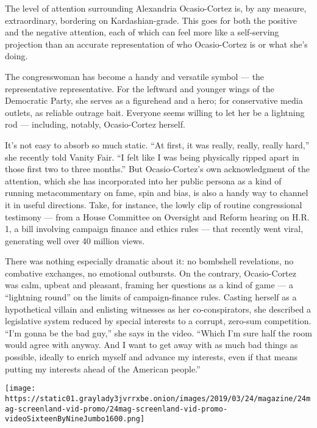 The level of attention surrounding Alexandria Ocasio-Cortez is, by any
measure, extraordinary, bordering on Kardashian-grade. This goes for
both the positive and the negative attention, each of which can feel
more like a self-serving projection than an accurate representation of
who Ocasio-Cortez is or what she's doing.

The congresswoman has become a handy and versatile symbol --- the
representative representative. For the leftward and younger wings of the
Democratic Party, she serves as a figurehead and a hero; for
conservative media outlets, as reliable outrage bait. Everyone seems
willing to let her be a lightning rod --- including, notably,
Ocasio-Cortez herself.

It's not easy to absorb so much static. ``At first, it was really,
really, really hard,'' she recently told Vanity Fair. ``I felt like I
was being physically ripped apart in those first two to three months.''
But Ocasio-Cortez's own acknowledgment of the attention, which she has
incorporated into her public persona as a kind of running metacommentary
on fame, spin and bias, is also a handy way to channel it in useful
directions. Take, for instance, the lowly clip of routine congressional
testimony --- from a House Committee on Oversight and Reform hearing on
H.R. 1, a bill involving campaign finance and ethics rules --- that
recently went viral, generating well over 40 million views.

There was nothing especially dramatic about it: no bombshell
revelations, no combative exchanges, no emotional outbursts. On the
contrary, Ocasio-Cortez was calm, upbeat and pleasant, framing her
questions as a kind of game --- a ``lightning round'' on the limits of
campaign-finance rules. Casting herself as a hypothetical villain and
enlisting witnesses as her co-conspirators, she described a legislative
system reduced by special interests to a corrupt, zero-sum competition.
``I'm gonna be the bad guy,'' she says in the video. ``Which I'm sure
half the room would agree with anyway. And I want to get away with as
much bad things as possible, ideally to enrich myself and advance my
interests, even if that means putting my interests ahead of the American
people.''

\texttt{[image: https://static01.graylady3jvrrxbe.onion/images/2019/03/24/magazine/24mag-screenland-vid-promo/24mag-screenland-vid-promo-videoSixteenByNineJumbo1600.png]}

